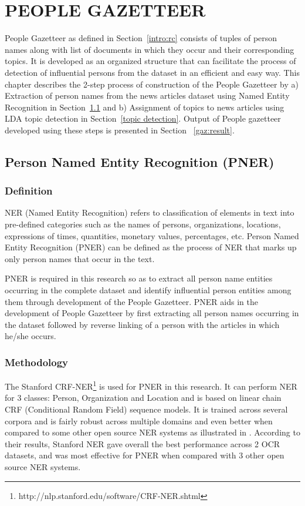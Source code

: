 \chapter{PEOPLE GAZETTEER}
\label{chapter:people gazetteer}

People Gazetteer as defined in Section~\ref{intro:rc} consists of tuples of person names along with list of documents in which they occur and their corresponding topics. It is developed as an organized structure that can facilitate the process of detection of influential persons from the dataset in an efficient and easy way. This chapter describes the 2-step process of construction of the People Gazetteer by
a) Extraction of person names from the news articles dataset using Named Entity Recognition in  Section~\ref{ner} and
b) Assignment of topics to news articles using LDA topic detection in  Section~\ref{topic detection}.
Output of People gazetteer developed using these steps is presented in Section ~\ref{gaz:result}.

\section{Person Named Entity Recognition (PNER)}
\label{ner}


\subsection{Definition}
NER (Named Entity Recognition) refers to classification of elements in text into pre-defined categories such as the names of persons, organizations, locations, expressions of times, quantities, monetary values, percentages, etc. 
Person Named Entity Recognition (PNER) can be defined as the process of NER that marks up only person names that occur in the text.

PNER is required in this research so as to extract all person name entities occurring in the complete dataset and identify influential person entities among them through development of the People Gazetteer. 
PNER aids in the development of People Gazetteer by first extracting all person names occurring in the dataset followed by reverse linking of a person with the articles in which he/she occurs.

\subsection{Methodology}

The Stanford CRF-NER\footnote{http://nlp.stanford.edu/software/CRF-NER.shtml} is used for PNER in this research. It can perform NER for 3 classes: Person, Organization and Location and is based on linear chain CRF (Conditional Random Field) sequence models. It is trained across several corpora and is fairly robust across multiple domains and even better when compared to some other open source NER systems as illustrated in \cite{rodriquez2012comparison}. According to their results, Stanford NER gave overall the best performance across 2 OCR datasets, and was most effective for PNER when compared with 3 other open source NER systems.


